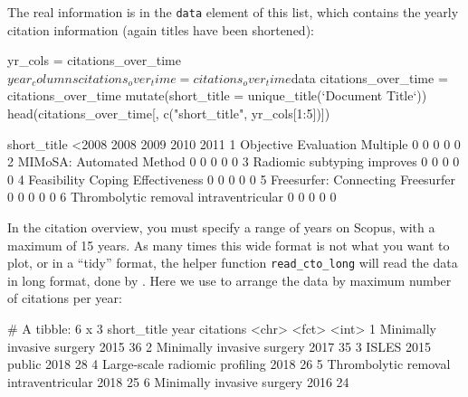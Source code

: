 The real information is in the \texttt{data} element of this list, which
contains the yearly citation information (again titles have been
shortened):

\begin{Schunk}
\begin{Sinput}
yr_cols = citations_over_time$year_columns
citations_over_time = citations_over_time$data
citations_over_time = citations_over_time %
  mutate(short_title = unique_title(`Document Title`))
head(citations_over_time[, c("short_title", yr_cols[1:5])])
\end{Sinput}
\begin{Soutput}
                            short_title <2008 2008 2009 2010 2011
1         Objective Evaluation Multiple     0    0    0    0    0
2              MIMoSA: Automated Method     0    0    0    0    0
3           Radiomic subtyping improves     0    0    0    0    0
4      Feasibility Coping Effectiveness     0    0    0    0    0
5     Freesurfer: Connecting Freesurfer     0    0    0    0    0
6 Thrombolytic removal intraventricular     0    0    0    0    0
\end{Soutput}
\end{Schunk}

In the citation overview, you must specify a range of years on Scopus,
with a maximum of 15 years. As many times this wide format is not what
you want to plot, or in a ``tidy'' format, the  helper
function \texttt{read\_cto\_long} will read the data in long format,
done by  \citep{tidyr}. Here we use  to
arrange the data by maximum number of citations per year:

\begin{Schunk}
\begin{Soutput}
# A tibble: 6 x 3
  short_title                           year  citations
  <chr>                                 <fct>     <int>
1 Minimally invasive surgery            2015         36
2 Minimally invasive surgery            2017         35
3 ISLES 2015 public                     2018         28
4 Large-scale radiomic profiling        2018         26
5 Thrombolytic removal intraventricular 2018         25
6 Minimally invasive surgery            2016         24
\end{Soutput}
\end{Schunk}

